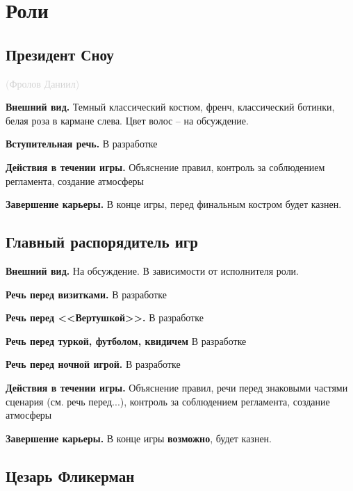 \documentclass[a4paper, 14pt]{extarticle}
\theoremstyle{definition}
\begin{document}
\section{Роли}

\subsection{Президент Сноу}
\textcolor{lightgray}{(Фролов Даниил)}

\par \textbf{Внешний вид.} Темный классический костюм, френч, классический ботинки, белая роза в кармане слева. Цвет волос -- на обсуждение.

\par \textbf{Вступительная речь.} В разработке

\par \textbf{Действия в течении игры.} Объяснение правил, контроль за соблюдением регламента, создание атмосферы

\par \textbf{Завершение карьеры.} В конце игры, перед финальным костром будет казнен.


\subsection{Главный распорядитель игр}

\par \textbf{Внешний вид.} На обсуждение. В зависимости от исполнителя роли.

\par \textbf{Речь перед визитками.} В разработке

\par \textbf{Речь перед <<Вертушкой>>.} В разработке

\par \textbf{Речь перед туркой, футболом, квидичем} В разработке

\par \textbf{Речь перед ночной игрой.} В разработке

\par \textbf{Действия в течении игры.} Объяснение правил, речи перед знаковыми частями сценария (см. речь перед...), контроль за соблюдением регламента, создание атмосферы

\par \textbf{Завершение карьеры.} В конце игры \textbf{возможно}, будет казнен.


\subsection{Цезарь Фликерман}
\end{document}
